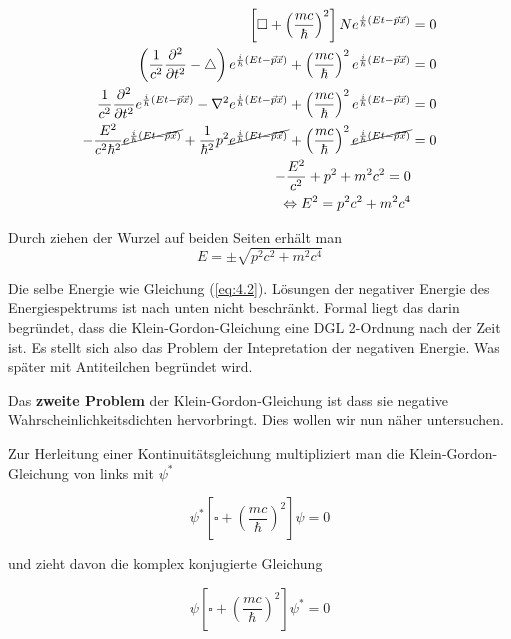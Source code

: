 \begin{align}
  \label{eq:10}
  \left[  \square + \left(\frac{mc}{\hbar}\right)^2\right] Ne^{\frac{i}{\hbar}(Et - \vec p\vec x)}   &= 0 \\
  \left(\frac{1}{c^2}\pdiff^2_t - \triangle \right) e^{\frac{i}{\hbar}(Et - \vec p\vec x)}  + \left(\frac{mc}{\hbar}\right)^2e^{\frac{i}{\hbar}(Et - \vec p\vec x)}   &= 0 \\
 \frac{1}{c^2}\pdiff^2_t e^{\frac{i}{\hbar}(Et - \vec p\vec x)}  - \nabla^2  e^{\frac{i}{\hbar}(Et - \vec p\vec x)}  + \left(\frac{mc}{\hbar}\right)^2e^{\frac{i}{\hbar}(Et - \vec p\vec x)}   &= 0 \\
 -\frac{E^2}{c^2\hbar^2} \cancel{ e^{\frac{i}{\hbar}(Et - \vec p\vec x)}}  +\frac{1}{\hbar^2}  p^2\cancel{ e^{\frac{i}{\hbar}(Et - \vec p\vec x)}}  + \left(\frac{mc}{\hbar}\right)^2 \cancel{ e^{\frac{i}{\hbar}(Et - \vec p\vec x)}}   &= 0 \\
 -\frac{E^2}{c^2} +  p^2  + m^2c^2 = 0 \\
\Leftrightarrow  E^2 =  p^2c^2  + m^2c^4
\end{align}

Durch ziehen der Wurzel auf beiden Seiten erhält man 
\begin{equation}
  \label{eq:11}
  E =\pm \sqrt{ p^2c^2  + m^2c^4 }
\end{equation}

Die selbe Energie wie Gleichung (\ref{eq:4.2}). Lösungen der negativer Energie des Energiespektrums ist nach unten nicht beschränkt. Formal liegt das darin begründet, dass die Klein-Gordon-Gleichung eine DGL 2-Ordnung nach der Zeit ist. Es stellt sich also das Problem der Intepretation der negativen Energie. Was später mit Antiteilchen begründet wird.

Das \textbf{zweite Problem} der Klein-Gordon-Gleichung ist dass sie negative Wahrscheinlichkeitsdichten hervorbringt. Dies wollen wir nun näher untersuchen.

Zur Herleitung einer Kontinuitätsgleichung multipliziert man die Klein-Gordon-Gleichung von links mit \(\psi^*\)

\begin{equation}
  \label{eq:12}
  \psi^*\left[  \square + \left(\frac{mc}{\hbar}\right)^2\right]\psi  = 0
\end{equation}

und zieht davon die komplex konjugierte Gleichung

\begin{equation}
  \label{eq:13}
  \psi \left[  \square + \left(\frac{mc}{\hbar}\right)^2\right]\psi^*  = 0
\end{equation}

